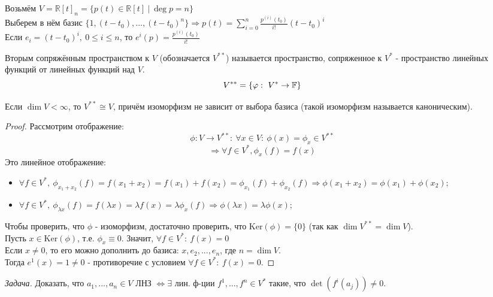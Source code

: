     \begin{example1}
        Возьмём $V = \mathbb{R}[t]_n = \{p(t) \in \mathbb{R}[t] \ | \ \deg p = n\}$\\
        Выберем в нём базис $\{1, (t-t_0), ... , (t-t_0)^n\} \Longrightarrow  p(t) = \sum \limits_{i=0}^n \frac{p^{(i)}(t_0)}{i!}(t-t_0)^i$\\
        Если $e_i = (t-t_0)^i, \ 0\leqslant i\leqslant n$, то $e^i(p) = \frac{p^{(i)}(t_0)}{i!}$
    \end{example1}
    \begin{definition}
        Вторым сопряжённым пространством к $V$ (обозначается $V^{**}$) называется пространство, сопряженное к $V^{*}$ - пространство линейных функций от линейных функций над $V$.
        $$V^{**} = \{\varphi: \ V^{*} \to \mathbb F\}$$ 
    \end{definition}
    \begin{theorem}
        Если $\dim V < \infty$, то $V^{**} \cong V$, причём изоморфизм не зависит от выбора базиса (такой изоморфизм называется каноническим). 
    \end{theorem}
    \begin{proof}
        Рассмотрим отображение: 
        $$\phi: V \rightarrow V^{**}: \ \forall x \in V: \ \phi(x) = \phi_x \in V^{**}$$
        $$\Longrightarrow \forall f\in V^{*}, \phi_x(f) = f(x)$$
        Это линейное отображение:
        \begin{itemize}
            \item $\forall f\in V^{*}, \ \phi_{x_1+x_2}(f) = f(x_1 + x_2) = f(x_1) + f(x_2) = \phi_{x_1}(f) + \phi_{x_2}(f) \Longrightarrow  \phi(x_1 + x_2) = \phi(x_1) + \phi(x_2);$ 
            \item $\forall f\in V^{*}, \ \phi_{\lambda x}(f) = f(\lambda x) = \lambda f(x) = \lambda\phi_{x}(f) \Longrightarrow \phi(\lambda x) = \lambda\phi(x);$ 
        \end{itemize}
        Чтобы проверить, что $\phi$ - изоморфизм, достаточно проверить, что $\text{Ker} (\phi) = \{0\}$ (так как $\dim V^{**} = \dim V$).\\
        Пусть $x \in \text{Ker} (\phi)$, т.е. $\phi_x \equiv 0$. Значит,  $\forall f \in V^{*} : \ f(x) = 0$\\
        Если $x \neq 0$, то его можно дополнить до базиса: $x, e_2, ... , e_n$, где $n = \dim V$.\\
        Тогда $e^1(x) = 1 \neq 0$ - противоречие с условием $\forall f \in V^{*} : \ f(x) = 0$.
    \end{proof}
    \textit{Задача.} Доказать, что $a_1,...,a_n\in V$ ЛНЗ $\Leftrightarrow \exists$ лин. ф-ции $f^1,...,f^n\in V^{*}$ такие, что $\det(f^i(a_j)) \neq 0$.
